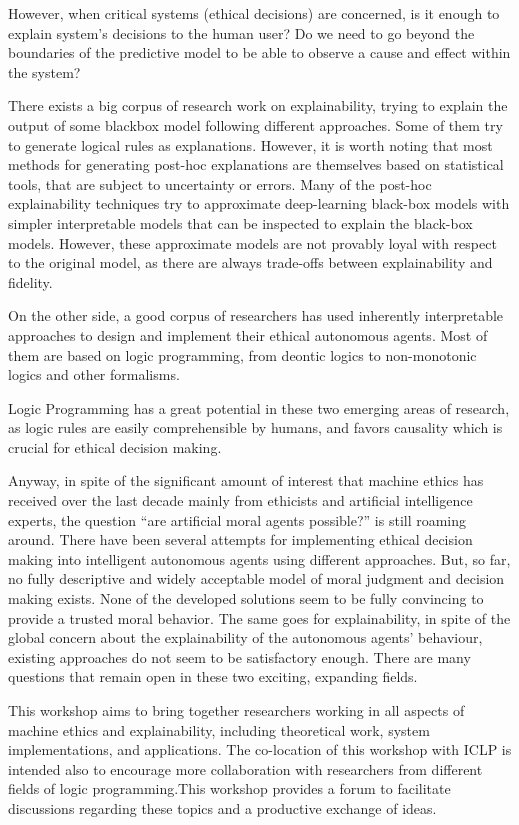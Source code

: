 \documentclass[prodmode,acmtecs]{acmsmall} %
\begin{document}
\begin{itemize}
  However, when critical systems (ethical decisions) are concerned, is it enough to explain system's decisions to the human user? Do we need to go beyond the boundaries of the predictive model to be able to observe a cause and effect within the system? 
 
  There exists a big corpus of research work on explainability, trying to explain the output of some blackbox model following different approaches. Some of them try to generate logical rules as explanations. However, it is worth noting that most methods for generating post-hoc explanations are themselves based on statistical tools, that are subject to uncertainty or errors. Many of the post-hoc explainability techniques try to approximate deep-learning black-box models with simpler interpretable models that can be inspected to explain the black-box models. However, these approximate models are not provably loyal with respect to the original model, as there are always trade-offs between explainability and fidelity.  
 
  On the other side, a good corpus of researchers has used inherently interpretable approaches to design and implement their ethical autonomous agents. Most of them are based on logic programming, from deontic logics to non-monotonic logics and other formalisms.  
 
  Logic Programming has a great potential in these two emerging areas of research, as logic rules are easily comprehensible by humans, and favors causality which is crucial for ethical decision making.  
 
  Anyway, in spite of the significant amount of interest that machine ethics has received over the last decade mainly from ethicists and artificial intelligence experts, the question ``are artificial moral agents possible?'' is still roaming around. There have been several attempts for implementing ethical decision making into intelligent autonomous agents using different approaches. But, so far, no fully descriptive and widely acceptable model of moral judgment and decision making exists. None of the developed solutions seem to be fully convincing to provide a trusted moral behavior. The same goes for explainability, in spite of the global concern about the explainability of the autonomous agents' behaviour, existing approaches do not seem to be satisfactory enough. There are many questions that remain open in these two exciting, expanding fields. 
 
  This workshop aims to bring together researchers working in all aspects of machine ethics and explainability, including theoretical work, system implementations, and applications. The co-location of this workshop with ICLP is intended also to encourage more collaboration with researchers from different fields of logic programming.This workshop provides a forum to facilitate discussions regarding these topics and a productive exchange of ideas. 
 

\end{itemize}
\end{document}
